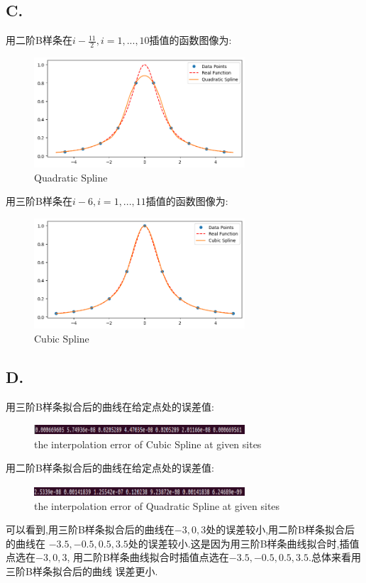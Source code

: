 \documentclass[a4paper]{article}
\begin{document}
\subsection*{C.}
用二阶B样条在$i-\frac{11}{2},i=1,...,10$插值的函数图像为:
\begin{figure}[H]
    \centering
    \includegraphics[width=0.7\textwidth]{C_QuadraticSpline.png}
    \caption{Quadratic Spline}
    \label{Fig}
\end{figure}
用三阶B样条在$i-6,i=1,...,11$插值的函数图像为:
\begin{figure}[H]
    \centering
    \includegraphics[width=0.7\textwidth]{C_CubicSpline.png}
    \caption{Cubic Spline}
    \label{Fig}
\end{figure}

\subsection*{D.}
用三阶B样条拟合后的曲线在给定点处的误差值:
\begin{figure}[H]
    \centering
    \includegraphics[width=0.7\textwidth]{D_Cubic.png}
    \caption{the interpolation error of Cubic Spline at given sites}
    \label{Fig}
\end{figure}
用二阶B样条拟合后的曲线在给定点处的误差值:
\begin{figure}[H]
    \centering
    \includegraphics[width=0.7\textwidth]{D_Quadratic.png}
    \caption{the interpolation error of Quadratic Spline at given sites}
    \label{Fig}
\end{figure}
可以看到,用三阶B样条拟合后的曲线在$-3,0,3$处的误差较小,用二阶B样条拟合后的曲线在
$-3.5,-0.5,0.5,3.5$处的误差较小.这是因为用三阶B样条曲线拟合时,插值点选在$-3,0,3$,
用二阶B样条曲线拟合时插值点选在$-3.5,-0.5,0.5,3.5$.总体来看用三阶B样条拟合后的曲线
误差更小.
\end{document}
